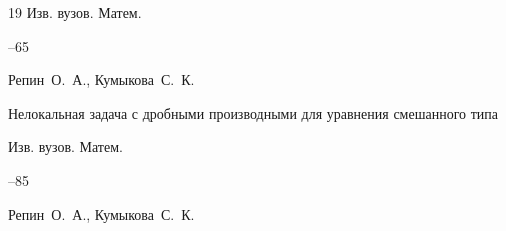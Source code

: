 \begin{thebibliography}{19}
\jour Изв. вузов. Матем.



–65  














\by Репин~О.~А., Кумыкова~С.~К.

\paper Нелокальная задача с дробными производными для уравнения смешанного типа

\jour Изв. вузов. Матем.



–85  














\by Репин~О.~А., Кумыкова~С.~К.


\end{thebibliography}
